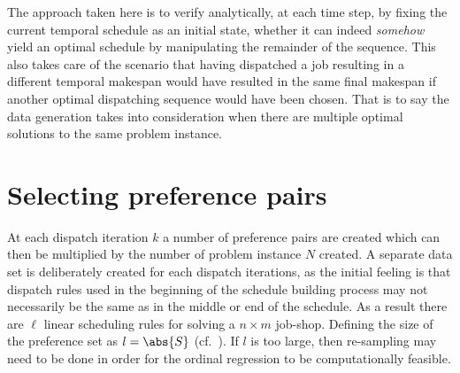 \documentclass[smallextended]{llncs}
\begin{document}
The approach taken here is to verify analytically, at each time step, by fixing the current temporal schedule as an initial state, whether it can indeed \emph{somehow} yield an optimal schedule by manipulating the remainder of the sequence. This also takes care of the scenario that having dispatched a job resulting in a different temporal makespan would have resulted in the same final makespan if another optimal dispatching sequence would have been chosen. That is to say the data generation takes into consideration when there are multiple optimal solutions to the same problem instance. 

\section{Selecting preference pairs}\label{sec:S:strategies}
At each dispatch iteration $k$ a number of preference pairs are created which can then be multiplied by the number of problem instance $N$ created. A separate data set is deliberately created for each dispatch iterations, as the initial feeling is that dispatch rules used in the beginning of the schedule building process may not necessarily be the same as in the middle or end of the schedule. As a result there are $\ell$ linear scheduling rules for solving a $n \times m$ job-shop.
Defining the size of the preference set as $l=\abs{S}$ (cf.~\cite{InRu11a}). If $l$ is too large, then re-sampling may 
need to be done in order for the ordinal regression to be computationally feasible. 


\end{document}
